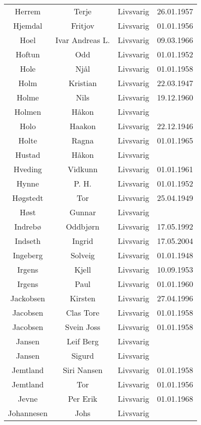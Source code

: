 \begin{tabular}{cccc}
        Herrem	&	Terje	&	Livsvarig 	&	26.01.1957	\\
        Hjemdal	&	Fritjov	&	Livsvarig 	&	01.01.1956	\\
        Hoel	&	Ivar Andreas L.	&	Livsvarig 	&	09.03.1966	\\
        Hoftun	&	Odd	&	Livsvarig 	&	01.01.1952	\\
        Hole	&	Njål	&	Livsvarig 	&	01.01.1958	\\
        Holm	&	Kristian	&	Livsvarig 	&	22.03.1947	\\
        Holme	&	Nils	&	Livsvarig 	&	19.12.1960	\\
        Holmen	&	Håkon	&	Livsvarig 	&		\\
        Holo	&	Haakon	&	Livsvarig 	&	22.12.1946	\\
        Holte	&	Ragna	&	Livsvarig 	&	01.01.1965	\\
        Hustad	&	Håkon	&	Livsvarig 	&		\\
        Hveding	&	Vidkunn	&	Livsvarig 	&	01.01.1961	\\
        Hynne	&	P. H. 	&	Livsvarig 	&	01.01.1952	\\
        Høgstedt	&	Tor	&	Livsvarig 	&	25.04.1949	\\
        Høst	&	Gunnar	&	Livsvarig 	&		\\
        Indrebø	&	Oddbjørn	&	Livsvarig 	&	17.05.1992	\\
        Indseth 	&	Ingrid	&	Livsvarig	&	17.05.2004	\\
        Ingeberg	&	Solveig	&	Livsvarig 	&	01.01.1948	\\
        Irgens	&	Kjell	&	Livsvarig 	&	10.09.1953	\\
        Irgens	&	Paul	&	Livsvarig 	&	01.01.1960	\\
        Jackobsen 	&	Kirsten	&	Livsvarig	&	27.04.1996	\\
        Jacobsen	&	Clas Tore	&	Livsvarig 	&	01.01.1958	\\
        Jacobsen	&	Svein Joss	&	Livsvarig 	&	01.01.1958	\\
        Jansen	&	Leif Berg	&	Livsvarig 	&		\\
        Jansen	&	Sigurd	&	Livsvarig 	&		\\
        Jemtland	&	Siri Nansen	&	Livsvarig 	&	01.01.1958	\\
        Jemtland	&	Tor	&	Livsvarig 	&	01.01.1956	\\
        Jevne	&	Per Erik	&	Livsvarig 	&	01.01.1968	\\
        Johannesen	&	Johs	&	Livsvarig 	&		\\

\end{tabular}
